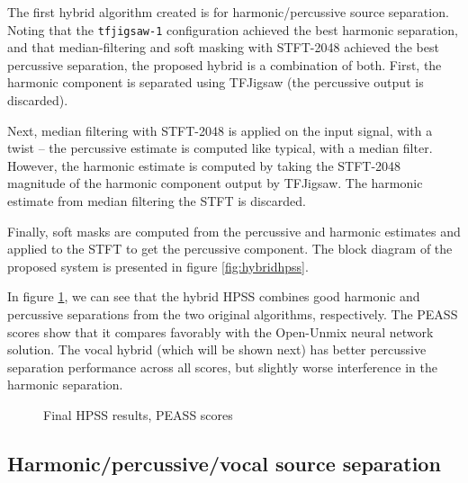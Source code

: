 \documentclass[letter,12pt]{article}
\begin{document}
The first hybrid algorithm created is for harmonic/percussive source separation. Noting that the \Verb#tfjigsaw-1# configuration achieved the best harmonic separation, and that median-filtering and soft masking with STFT-2048 achieved the best percussive separation, the proposed hybrid is a combination of both. First, the harmonic component is separated using TFJigsaw (the percussive output is discarded).

Next, median filtering with STFT-2048 is applied on the input signal, with a twist -- the percussive estimate is computed like typical, with a median filter. However, the harmonic estimate is computed by taking the STFT-2048 magnitude of the harmonic component output by TFJigsaw. The harmonic estimate from median filtering the STFT is discarded.

Finally, soft masks are computed from the percussive and harmonic estimates and applied to the STFT to get the percussive component. The block diagram of the proposed system is presented in figure \ref{fig:hybridhpss}.

In figure \ref{fig:finalhpss}, we can see that the hybrid HPSS combines good harmonic and percussive separations from the two original algorithms, respectively. The PEASS scores show that it compares favorably with the Open-Unmix neural network solution. The vocal hybrid (which will be shown next) has better percussive separation performance across all scores, but slightly worse interference in the harmonic separation.

\begin{figure}[ht]
	\centering
	\caption{Final HPSS results, PEASS scores}
	\label{fig:finalhpss}
\end{figure}

\subsection{Harmonic/percussive/vocal source separation}
\end{document}
